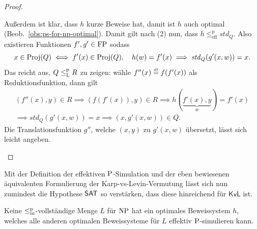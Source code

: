 \begin{proof}
\begin{prooflist}
    Außerdem ist klar, dass $h$ kurze Beweise hat, damit ist $h$ auch optimal (Beob.~\ref{obs:ps-for-np-optimal}). %
    Damit gilt nach (2) nun, dass $h\leq^\mathrm p_\mathrm{eff} \mathit{std}_Q$. Also existieren Funktionen $f',g'\in\FP$ sodass
    \[ x\in \Proj(Q)\iff f'(x)\in\Proj(Q),\quad h(w)=f'(x) \implies \mathit{std}_Q(g'(x,w))=x. \]%
    Das reicht aus, $Q\leqlp R$ zu zeigen: wähle $f''(x)\defeq f(f'(x))$ als Reduktionsfunktion, dann gilt
    \begin{gather*}
        (f''(x), y)\in R \implies (f(f'(x)), y)\in R \implies h(\underbrace{f'(x),y}_{w})=f'(x) \\
    \implies \mathit{std}_Q(g'(x,w))=x \implies (x,g'(x,w))\in Q. \end{gather*}
    Die Translationsfunktion $g''$, welche $(x,y)$ zu $g'(x,w)$ übersetzt, lässt sich leicht angeben.
\end{prooflist}
\end{proof}

Mit der Definition der effektiven $\P$-Simulation und der eben bewiesenen äquivalenten Formulierung der Karp-vs-Levin-Vermutung lässt sich nun zumindest die Hypothese $\hSAT$ so verstärken, dass diese hinreichend für $\mathsf{KvL}$ ist.


\begin{conjecture}
    Keine $\leqmp$-vollständige Menge $L$ für $\NP$ hat ein optimales Beweissystem $h$, welches alle anderen optimalen Beweissysteme für $L$ effektiv $\P$-simulieren kann. 
\end{conjecture}

%


